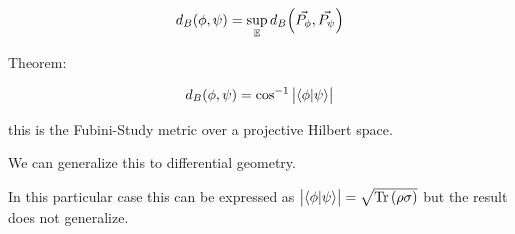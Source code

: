 \documentclass[main.tex]{subfiles}
\begin{document}
\begin{equation}
  d_B (\phi, \psi) = \sup _\mathbb{E} d_B\qty(\vec{P_\phi}, \vec{P_\psi})
\end{equation}

Theorem:

\begin{equation}
  d_B (\phi, \psi) = \cos^{-1} \abs{\braket{\phi}{\psi}}
\end{equation}

this is the Fubini-Study metric over a projective Hilbert space.

We can generalize this to differential geometry.

\begin{greenbox}
  In this particular case this can be expressed as
  \(\abs{\braket{\phi}{\psi}} = \sqrt{\operatorname*{Tr} \qty(\rho\sigma)}\)
  but the result does not generalize.
\end{greenbox}
\end{document}

